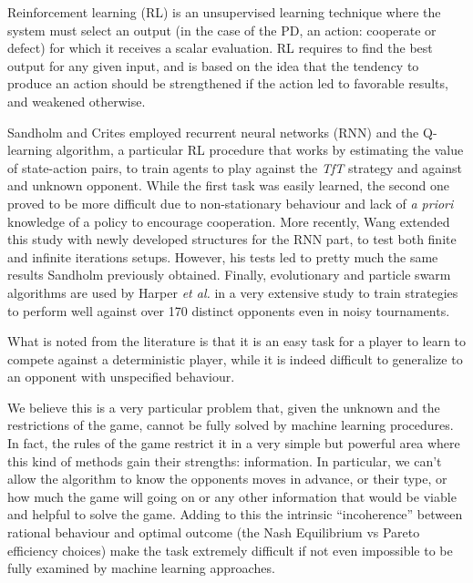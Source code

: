 \documentclass[journal,10pt,twoside]{IEEEtran}
\begin{document}
Reinforcement learning (RL) is an unsupervised learning technique where the system must select an output (in the case of the PD, an action: cooperate or defect) for which it receives a scalar evaluation. RL requires to find the best output for any given input, and is based on the idea that the tendency to produce an action should be strengthened if the action led to favorable results, and weakened otherwise.~\cite{sandholmRL}

Sandholm and Crites \cite{sandholmRL} employed recurrent neural networks (RNN) and the Q-learning algorithm, a particular RL procedure that works by estimating the value of state-action pairs, to train agents to play against the \textit{TfT} strategy and against and unknown opponent. While the first task was easily learned, the second one proved to be more difficult due to non-stationary behaviour and lack of \textit{a priori} knowledge of a policy to encourage cooperation.
More recently, Wang \cite{kedaoRL} extended this study with newly developed structures for the RNN part, to test both finite and infinite iterations setups. However, his tests led to pretty much the same results Sandholm previously obtained.
Finally, evolutionary and particle swarm algorithms are used by Harper \textit{et al.} in a very extensive study \cite{plosRLdominant} to train strategies to perform well against over 170 distinct opponents even in noisy tournaments.

What is noted from the literature is that it is an easy task for a player to learn to compete against a deterministic player, while it is indeed difficult to generalize to an opponent with unspecified behaviour.

We believe this is a very particular problem that, given the unknown and the restrictions of the game, cannot be fully solved by machine learning procedures. In fact, the rules of the game restrict it in a very simple but powerful area where this kind of methods gain their strengths: information. In particular, we can't allow the algorithm to know the opponents moves in advance, or their type, or how much the game will going on or any other information that would be viable and helpful to solve the game. Adding to this the intrinsic ``incoherence'' between rational behaviour and optimal outcome (the Nash Equilibrium vs Pareto efficiency choices) make the task extremely difficult if not even impossible to be fully examined by machine learning approaches.
\end{document}
